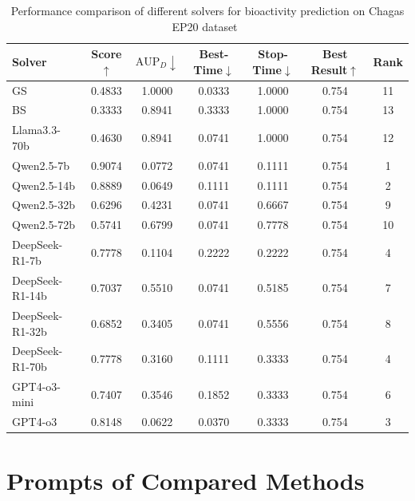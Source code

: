 \begin{table}[h]
    \centering
    \setlength{\tabcolsep}{3pt}
    \renewcommand\arraystretch{1.5}
    \caption{Performance comparison of different solvers for bioactivity prediction on Chagas EP20 dataset~\cite{Chagas}}
    \begin{tabular}{l|cccccc}
    \toprule
    Solver           & Score$\uparrow$ & $\text{AUP}_D\downarrow$ & Best-Time$\downarrow$ & Stop-Time$\downarrow$ & Best Result$\uparrow$ & Rank \\
    \midrule
    GS & 0.4833 & 1.0000 & 0.0333 & 1.0000 & 0.754 & 11 \\
    BS & 0.3333 & 0.8941 & 0.3333 & 1.0000 & 0.754 & 13 \\
    Llama3.3-70b & 0.4630 & 0.8941 & 0.0741 & 1.0000 & 0.754 & 12 \\
    Qwen2.5-7b & 0.9074 & 0.0772 & 0.0741 & 0.1111 & 0.754 & 1 \\
    Qwen2.5-14b & 0.8889 & 0.0649 & 0.1111 & 0.1111 & 0.754 & 2 \\
    Qwen2.5-32b & 0.6296 & 0.4231 & 0.0741 & 0.6667 & 0.754 & 9 \\
    Qwen2.5-72b & 0.5741 & 0.6799 & 0.0741 & 0.7778 & 0.754 & 10 \\
    DeepSeek-R1-7b & 0.7778 & 0.1104 & 0.2222 & 0.2222 & 0.754 & 4 \\
    DeepSeek-R1-14b & 0.7037 & 0.5510 & 0.0741 & 0.5185 & 0.754 & 7 \\
    DeepSeek-R1-32b & 0.6852 & 0.3405 & 0.0741 & 0.5556 & 0.754 & 8 \\
    DeepSeek-R1-70b & 0.7778 & 0.3160 & 0.1111 & 0.3333 & 0.754 & 4 \\
    GPT4-o3-mini & 0.7407 & 0.3546 & 0.1852 & 0.3333 & 0.754 & 6 \\
    GPT4-o3 & 0.8148 & 0.0622 & 0.0370 & 0.3333 & 0.754 & 3 \\
    \bottomrule
    \end{tabular}
    \label{tab:chagas}
\end{table}


\section{Prompts of Compared Methods}
\label{sec:supp_prompt}

